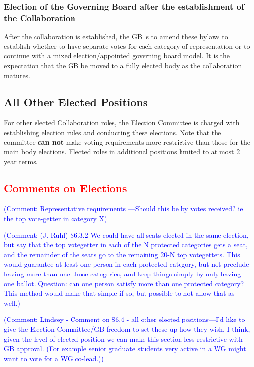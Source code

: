 \documentclass[12pt]{article}
\newcommand{\Comment}[1]{\textcolor{Blue}{(Comment: #1)}}
\begin{document}
\subsubsection{Election of the Governing Board after the establishment of the Collaboration}
 After the collaboration is established, the GB is to amend these bylaws to establish whether to have separate votes for each category of representation or to continue with a mixed election/appointed governing board model. It is the expectation that the GB be moved to a fully elected body as the collaboration matures. 



\subsection{All Other Elected Positions}
For other elected Collaboration roles, the Election Committee is charged with establishing election rules and conducting these elections. Note that the committee \textbf{can not} make voting requirements more restrictive than those for the main body elections. Elected  roles in additional positions limited to at most 2 year terms. 


\subsection{\textcolor{red}{Comments on Elections}}

\Comment{Representative requirements ---Should this be by votes received? ie the top vote-getter in category X}

\Comment{(J. Ruhl) S6.3.2 We could have all seats elected in the same election, but say that the top votegetter in each of the N protected categories gets a seat, and the remainder of the seats go to the remaining 20-N top votegetters.  This would guarantee at least one person in each protected category, but not preclude having more than one those categories, and keep things simply by only having one ballot.  Question:  can one person satisfy more than one protected category?  This method would make that simple if so, but possible to not allow that as well.}

\Comment{Lindsey - Comment on S6.4 - all other elected positions---I'd like to give the Election Committee/GB freedom to set these up how they wish. I think, given the level of elected position we can make this section less restrictive with GB approval.  (For example senior graduate students very active in a WG might want to vote for a WG co-lead.)}
\end{document}
